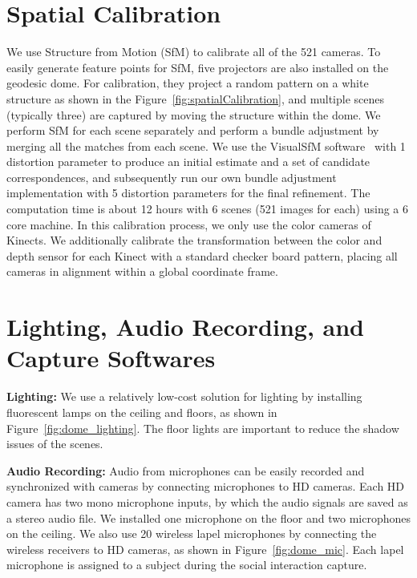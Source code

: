 \section{Spatial Calibration}
We use Structure from Motion (SfM) to calibrate all of the 521 cameras. To easily generate feature points for SfM, five projectors are also installed on the geodesic dome. For calibration, they project a random pattern on a white structure as shown in the Figure~\ref{fig:spatialCalibration}, and multiple scenes (typically three) are captured by moving the structure within the dome. We perform SfM for each scene separately and perform a bundle adjustment by merging all the matches from each scene. We use the VisualSfM software~\cite{vsfm} with 1 distortion parameter to produce an initial estimate and a set of candidate correspondences, and subsequently run our own bundle adjustment implementation with 5 distortion parameters for the final refinement. The computation time is about 12 hours with 6 scenes (521 images for each) using a 6 core machine. 
In this calibration process, we only use the color cameras of Kinects. We additionally calibrate the transformation between the color and depth sensor for each Kinect with a standard checker board pattern, placing all cameras in alignment within a global coordinate frame.

\section{Lighting, Audio Recording, and Capture Softwares}

\noindent \textbf{Lighting:} We use a relatively low-cost solution for lighting by installing fluorescent lamps on the ceiling and floors, as shown in Figure~\ref{fig:dome_lighting}. The floor lights are important to reduce the shadow issues of the scenes. 

\noindent \textbf{Audio Recording:} Audio from microphones can be easily recorded and synchronized with cameras by connecting microphones to HD cameras. Each HD camera has two mono microphone inputs, by which the audio signals are saved as a stereo audio file. We installed one microphone on the floor and two microphones on the ceiling. We also use 20 wireless lapel microphones by connecting the wireless receivers to HD cameras, as shown in Figure~\ref{fig:dome_mic}. Each lapel microphone is assigned to a subject during the social interaction capture.  

